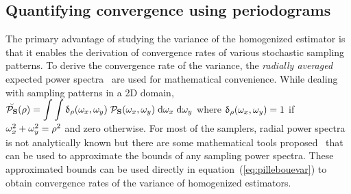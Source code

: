 \subsection{Quantifying convergence using periodograms}
The primary advantage of studying the variance of the homogenized estimator is that it enables the derivation of convergence rates of various stochastic sampling patterns.
To derive the convergence rate of the variance, the \emph{radially averaged} expected power spectra \Exp{\RadialPowerSpec{\sfsym}(\RadialFreq)}\ are used for mathematical convenience. While dealing with sampling patterns in a 2D domain, 
$\breve{\mathcal{P}_{\mathbf{S}}}(\rho) = 
  \displaystyle\int \displaystyle\int \updelta_\rho (\mathbf{\omega}_x, \mathbf{\omega}_y) \; \mathcal{P}_{\mathbf{S}}(\mathbf{\omega}_x, \mathbf{\omega}_y) \; \mathrm{d}\mathbf{\omega}_x \; \mathrm{d}\mathbf{\omega}_y$ where $\updelta_\rho (\mathbf{\omega}_x, \mathbf{\omega}_y) = 1$ if $\mathbf{\omega}_x^2 + \mathbf{\omega}_y^2 = \rho^2$ and zero otherwise.
For most of the samplers,  radial power spectra is not analytically known but there are some mathematical  tools proposed~\cite{Pilleboue:2015:VAM} that can be used to approximate the bounds of any sampling power spectra. These approximated bounds can be used directly in equation~(\ref{eq:pillebouevar}) to obtain convergence rates of the variance of homogenized estimators.


